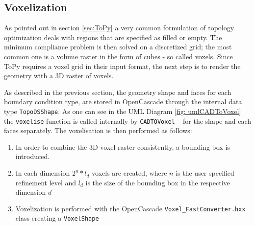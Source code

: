\subsection{Voxelization}
\label{sec: Voxelization}

As pointed out in section \ref{sec:ToPy} a very common formulation of topology optimization deals with regions that are specified as filled or empty. The minimum compliance problem is then solved on a discretized grid; the most common one is a volume raster in the form of cubes - so called voxels. Since ToPy requires a voxel grid in their input format, the next step is to render the geometry with a 3D raster of voxels.  

As described in the previous section, the geometry shape and faces for each boundary condition type, are stored in OpenCascade through the internal data type \lstinline|TopoDSShape|. As one can see in the UML Diagram \ref{fig: umlCADToVoxel} the \lstinline|voxelise| function is called internally by \lstinline|CADTOVoxel| -- for the shape and each faces separately. The voxelisation is then performed as follows: 
\begin{enumerate}
\item In order to combine the 3D voxel raster consistently, a bounding box is introduced.
\item In each dimension $2^n*l_d$ voxels are created, where $n$ is the user specified refinement level and $l_d$ is the size of the bounding box in the respective dimension $d$
\item Voxelization is performed with the OpenCascade  \lstinline|Voxel_FastConverter.hxx| class creating a \lstinline|VoxelShape|
\end{enumerate}

